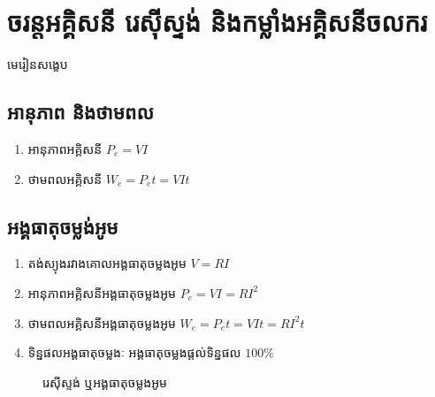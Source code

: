 \chapter{ចរន្តអគ្គិសនី រេស៊ីស្ទង់ និងកម្លាំងអគ្គិសនីចលករ}
\begin{center}
	{\Large \kml\color{magenta}មេរៀនសង្ខេប}
\end{center}
\section{អានុភាព និងថាមពល}
\begin{enumerate}[k,2]
	\item អានុភាពអគ្គិសនី $P_{e}=VI$
	\item ថាមពលអគ្គិសនី $W_{e}=P_{e}t=VIt$
\end{enumerate}
\section{អង្គធាតុចម្លង់អូម}
\begin{enumerate}[k]
	\item តង់ស្យុងរវាងគោលអង្គធាតុចម្លងអូម $V=RI$
	\item អានុភាពអគ្គិសនីអង្គធាតុចម្លងអូម $P_{e}=VI=RI^{2}$
	\item ថាមពលអគ្គិសនីអង្គធាតុចម្លងអូម $W_{e}=P_{e}t=VIt=RI^{2}t$
	\item ទិន្នផលអង្គធាតុចម្លងៈ អង្គធាតុចម្លងផ្តល់ទិន្នផល $100\%$
\end{enumerate}
\begin{figure}[H]
	\centering
	\caption{\DS រេស៊ីស្ទង់ ឬអង្គធាតុចម្លងអូម}
\end{figure}
